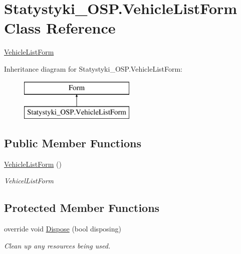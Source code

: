 \hypertarget{class_statystyki___o_s_p_1_1_vehicle_list_form}{}\section{Statystyki\+\_\+\+O\+S\+P.\+Vehicle\+List\+Form Class Reference}
\label{class_statystyki___o_s_p_1_1_vehicle_list_form}


\mbox{\hyperlink{class_statystyki___o_s_p_1_1_vehicle_list_form}{Vehicle\+List\+Form}}  


Inheritance diagram for Statystyki\+\_\+\+O\+S\+P.\+Vehicle\+List\+Form\+:\begin{figure}[H]
\begin{center}
\leavevmode
\includegraphics[height=2.000000cm]{class_statystyki___o_s_p_1_1_vehicle_list_form}
\end{center}
\end{figure}
\subsection*{Public Member Functions}
\begin{DoxyCompactItemize}
\item 
\mbox{\hyperlink{class_statystyki___o_s_p_1_1_vehicle_list_form_ada3657a1f3564a978e488301643e2271}{Vehicle\+List\+Form}} ()
\begin{DoxyCompactList}\small\item\em Vehicel\+List\+Form \end{DoxyCompactList}\end{DoxyCompactItemize}
\subsection*{Protected Member Functions}
\begin{DoxyCompactItemize}
\item 
override void \mbox{\hyperlink{class_statystyki___o_s_p_1_1_vehicle_list_form_a91994c91f80d726d8e8e7adc873d35ba}{Dispose}} (bool disposing)
\begin{DoxyCompactList}\small\item\em Clean up any resources being used. \end{DoxyCompactList}\end{DoxyCompactItemize}

